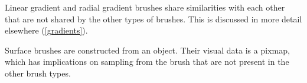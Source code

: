 \pnum
Linear gradient and radial gradient brushes share similarities with each other that are not shared by the other types of brushes. This is discussed in more detail elsewhere (\ref{gradients}).

\pnum
Surface brushes are constructed from an  object. Their visual data is a pixmap, which has implications on sampling from the brush that are not present in the other brush types.

\addtocounter{SectionDepthBase}{1}






%
%
%
%
\addtocounter{SectionDepthBase}{-1}
